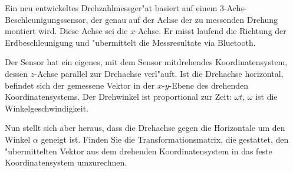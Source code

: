 Ein neu entwickeltes Drehzahlmessger"at basiert auf einem
3-Achs-Beschleunigungs\-sensor, der genau auf der Achse der zu
messenden Drehung montiert wird. Diese Achse sei die $x$-Achse.
Er misst laufend die Richtung der Erdbeschleunigung und "ubermittelt
die Messresultate via Bluetooth.

Der Sensor hat ein eigenes, mit dem Sensor mitdrehendes Koordinatensystem,
dessen $z$-Achse parallel zur Drehachse verl"auft.
Ist die Drehachse horizontal, befindet sich der gemessene Vektor
in der $x$-$y$-Ebene des drehenden Koordinatensystems.
Der Drehwinkel ist proportional zur Zeit: $\omega t$, $\omega$ ist die
Winkelgeschwindigkeit.

Nun stellt sich aber heraus, dass die Drehachse
gegen die Horizontale um den Winkel $\alpha$ geneigt ist. 
Finden Sie die Transformationsmatrix, die gestattet, den "ubermittelten Vektor
aus dem drehenden Koordinatensystem in das feste Koordinatensystem
umzurechnen.

